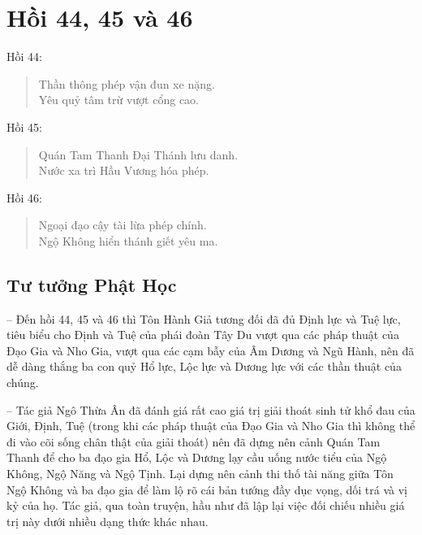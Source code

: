 \chapter{Hồi 44, 45 và 46} %
\label{cha:hoi_44_45}

Hồi 44:

\begin{verse}
\begin{itshape}
Thần thông phép vận đun xe nặng.\\
Yêu quỷ tâm trừ vượt cổng cao.
\end{itshape}
\end{verse}

Hồi 45:

\begin{verse}
\begin{itshape}
Quán Tam Thanh Đại Thánh lưu danh.\\
Nước xa trì Hầu Vương hóa phép.
\end{itshape}
\end{verse}

Hồi 46:

\begin{verse}
\begin{itshape}
Ngoại đạo cậy tài lừa phép chính.\\
Ngộ Không hiển thánh giết yêu ma.
\end{itshape}
\end{verse}

\section{Tư tưởng Phật Học} %
\label{sec:44_45_phat_hoc}

-- Đến hồi 44, 45 và 46 thì Tôn Hành Giả tương đối đã đủ Định lực và Tuệ lực, tiêu biểu cho Định và Tuệ của phái đoàn Tây Du vượt qua các pháp thuật của Đạo Gia và Nho Gia, vượt qua các cạm bẫy của Âm Dương và Ngũ Hành, nên đã dễ dàng thắng ba con quỷ Hổ lực, Lộc lực và Dương lực với các thần thuật của chúng.

-- Tác giả Ngô Thừa Ân đã đánh giá rất cao giá trị giải thoát sinh tử khổ đau của Giới, Định, Tuệ (trong khi các pháp thuật của Đạo Gia và Nho Gia thì không thể đi vào cõi sống chân thật của giải thoát) nên đã dựng nên cảnh Quán Tam Thanh để cho ba đạo gia Hổ, Lộc và Dương lạy cầu uống nước tiểu của Ngộ Không, Ngộ Năng và Ngộ Tịnh. Lại dựng nên cảnh thi thố tài năng giữa Tôn Ngộ Không và ba đạo gia để làm lộ rõ cái bản tướng đầy dục vọng, dối trá và vị kỷ của họ. Tác giả, qua toàn truyện, hầu như đã lập lại việc đối chiếu nhiều giá trị này dưới nhiều dạng thức khác nhau.


